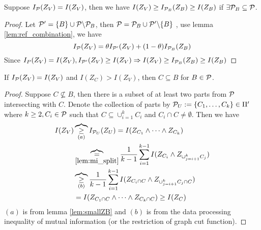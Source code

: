 \documentclass{article}
\begin{document}
\begin{lemma}\label{lem:smallZB}
Suppose $I_{\P}(Z_V) = I(Z_V)$, then we have $I(Z_V) \geq I_{\P_B}(Z_B) \geq I(Z_B)$ if $\exists \P_B \subseteq \P$.
\end{lemma}
\begin{proof}
Let $\P' = \{B\} \cup \P\backslash \P_B$, then $\P = \P_B \cup \P'\backslash\{B\}$ , use lemma \ref{lem:ref_combination}, we have
\begin{equation}
I_{\P}(Z_V) = \theta I_{\P'}(Z_V) + (1-\theta) I_{\P_B}(Z_B)
\end{equation}
Since  $I_{P}(Z_V) = I(Z_V), I_{\P'}(Z_V)\geq I(Z_V) \Rightarrow I(Z_V) \geq I_{\P_B}(Z_B) \geq I(Z_B)$ 
\end{proof}
\begin{lemma}\label{lem:LargeIZV}
	If $I_{\P}(Z_V)=I(Z_V)$ and $I(Z_C) > I(Z_V)$, then $C\subseteq B$ for $B \in \P$.
\end{lemma}
\begin{proof}
	Suppose $C \not\subseteq B$, then there is a subset of at least two parts from $\P$ intersecting with $C$. Denote the collection of parts by $\P_U :=\{C_1, \dots, C_k\} \in \Pi'$ where 
	$k \geq 2, C_i \in \P $ such that $C \subseteq \cup_{i=1}^k C_i$ and $C_i \cap C \neq \emptyset$.
	Then we have
\begin{align*}
	I(Z_V) & \overbrace{\geq}_{(a)} I_{\P_U}(Z_U)  = I(Z_{C_1} \wedge \dots \wedge Z_{C_k})\\
	& \overbrace{=}_{\ref{lem:mi_split}} {1\over k-1}\sum_{i=1}^{k-1} I(Z_{C_i} \wedge Z_{\cup_{j=i+1}^k C_j}) \\
	& \overbrace{\geq}_{(b)} \frac{1}{k-1}\sum_{i=1}^{k-1} I(Z_{C_i \cap C} \wedge Z_{\cup_{j=i+1}^k C_j \cap C}) \\
	& = I(Z_{C_1 \cap C} \wedge \dots \wedge Z_{C_k \cap C}) \geq I(Z_C)
\end{align*}
$(a)$ is from lemma \ref{lem:smallZB} and $(b)$ is from the data processing inequality of mutual information (or the restriction of graph cut function).
\end{proof}
\end{document}
